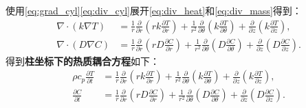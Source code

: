 \documentclass[12pt,a4paper,fontset=none]{ctexart}
\begin{document}
使用\eqref{eq:grad_cyl}\eqref{eq:div_cyl}展开\eqref{eq:div_heat}和\eqref{eq:div_mass}得到：
\begin{align}
\nabla\cdot(k\nabla T) &= \frac1r\frac{\partial}{\partial r}\left(rk\frac{\partial T}{\partial r}\right) + \frac{1}{r^2}\frac{\partial}{\partial\theta}\left(k\frac{\partial T}{\partial\theta}\right) + \frac{\partial}{\partial z}\left(k\frac{\partial T}{\partial z}\right),\label{eq:div_heat_cyl}\\[10pt]
\nabla\cdot(D\nabla C) &= \frac1r\frac{\partial}{\partial r}\left(rD\frac{\partial C}{\partial r}\right) + \frac{1}{r^2}\frac{\partial}{\partial\theta}\left(D\frac{\partial C}{\partial\theta}\right) + \frac{\partial}{\partial z}\left(D\frac{\partial C}{\partial z}\right).\label{eq:div_mass_cyl}
\end{align}
得到\textbf{柱坐标下的热质耦合方程}如下：
\begin{align}
\rho c_p\frac{\partial T}{\partial t}
&=\frac1r\frac{\partial}{\partial r}\left(rk\frac{\partial T}{\partial r}\right)
+\frac{1}{r^2}\frac{\partial}{\partial\theta}\left(k\frac{\partial T}{\partial\theta}\right)
+\frac{\partial}{\partial z}\left(k\frac{\partial T}{\partial z}\right),\label{eq:cyl_heat}\\[10pt]
\frac{\partial C}{\partial t}
&=\frac1r\frac{\partial}{\partial r}\left(rD\frac{\partial C}{\partial r}\right)
+\frac{1}{r^2}\frac{\partial}{\partial\theta}\left(D\frac{\partial C}{\partial\theta}\right)
+\frac{\partial}{\partial z}\left(D\frac{\partial C}{\partial z}\right).\label{eq:cyl_mass}
\end{align}
\end{document}

